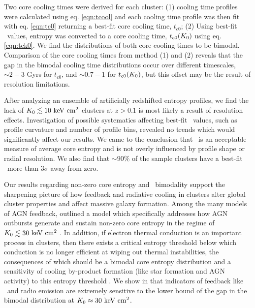 \documentclass[12pt,preprint]{aastex}
\begin{document}
Two core cooling times were derived for each cluster: (1) cooling time
profiles were calculated using eq. \ref{eqn:tcool} and each cooling
time profile was then fit with eq. \ref{eqn:tc0} returning a best-fit
core cooling time, $t_{c0}$; (2) Using best-fit \kna\ values, entropy
was converted to a core cooling time, $t_{c0}(K_0)$ using
eq. \ref{eqn:tck0}. We find the distributions of both core cooling
times to be bimodal. Comparison of the core cooling times from method
(1) and (2) reveals that the gap in the bimodal cooling time
distributions occur over different timescales, $\sim 2-3$ Gyrs for
$t_{c0}$, and $\sim 0.7-1$ for $t_{c0}(K_0)$, but this offset may be
the result of resolution limitations.

After analyzing an ensemble of artificially redshifted entropy
profiles, we find the lack of $K_0 \lesssim 10 \mathrm{\mbox{\ensuremath{\mathrm{~keV}}} \mathrm{\mbox{\ensuremath{\mathrm{~cm}}}^2}}$ clusters at $z > 0.1$
is most likely a result of resolution effects. Investigation of
possible systematics affecting best-fit \kna\ values, such as profile
curvature and number of profile bins, revealed no trends which would
significantly affect our results. We came to the conclusion that
\kna\ is an acceptable measure of average core entropy and is not
overly influenced by profile shape or radial resolution. We also find
that $\sim90\%$ of the sample clusters have a best-fit \kna\ more than
$3\sigma$ away from zero.

Our results regarding non-zero core entropy and \kna\ bimodality
support the sharpening picture of how feedback and radiative cooling
in clusters alter global cluster properties and affect massive galaxy
formation. Among the many models of AGN feedback, \citet{agnframework}
outlined a model which specifically addresses how AGN outbursts
generate and sustain non-zero core entropy in the regime of $K_0 \lesssim
30 \mathrm{\mbox{\ensuremath{\mathrm{~keV}}} \mathrm{\mbox{\ensuremath{\mathrm{~cm}}}^2}}$ \citep[see also][]{kaiser03}. In addition, if electron
thermal conduction is an important process in clusters, then there
exists a critical entropy threshold below which conduction is no
longer efficient at wiping out thermal instabilities, the consequences
of which should be a bimodal core entropy distribution and a
sensitivity of cooling by-product formation (like star formation and
AGN activity) to this entropy threshold \citep{conduction,
  2008arXiv0804.3823G}. We show in \citet{haradent} that indicators of
feedback like \halpha\ and radio emission are extremely sensitive to
the lower bound of the gap in the bimodal distribution at $K_0
\approx 30 \mathrm{\mbox{\ensuremath{\mathrm{~keV}}} \mathrm{\mbox{\ensuremath{\mathrm{~cm}}}^2}}$.
\end{document}
